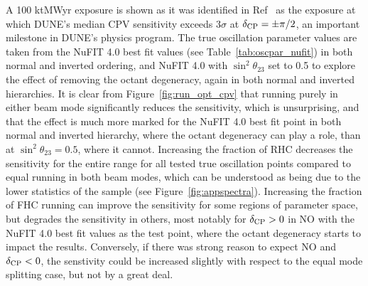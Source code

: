 A 100 ktMWyr exposure is shown as it was identified in Ref~\cite{Abi:2020qib} as the exposure at which DUNE's median CPV sensitivity exceeds 3$\sigma$ at $\delta_{\rm CP} = \pm\pi/2$, an important milestone in DUNE's physics program. The true oscillation parameter values are taken from the NuFIT 4.0 best fit values (see Table~\ref{tab:oscpar_nufit}) in both normal and inverted ordering, and NuFIT 4.0 with $\sin^{2}\theta_{23}$ set to 0.5 to explore the effect of removing the octant degeneracy, again in both normal and inverted hierarchies. It is clear from Figure~\ref{fig:run_opt_cpv} that running purely in either beam mode significantly reduces the sensitivity, which is unsurprising, and that the effect is much more marked for the NuFIT 4.0 best fit point in both normal and inverted hierarchy, where the octant degeneracy can play a role, than at $\sin^{2}\theta_{23} = 0.5$, where it cannot. Increasing the fraction of RHC decreases the sensitivity for the entire \deltacp range for all tested true oscillation points compared to equal running in both beam modes, which can be understood as being due to the lower statistics of the \anue sample (see Figure~\ref{fig:appspectra}). Increasing the fraction of FHC running can improve the sensitivity for some regions of parameter space, but degrades the sensitivity in others, most notably for $\delta_{\rm CP} > 0$ in NO with the NuFIT 4.0 best fit values as the test point, where the octant degeneracy starts to impact the results. Conversely, if there was strong reason to expect NO and $\delta_{\rm CP} < 0$, the senstivity could be increased slightly with respect to the equal mode splitting case, but not by a great deal.

